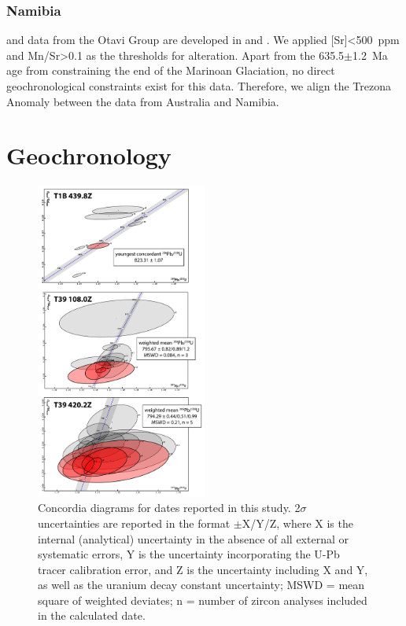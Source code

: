 \subsubsection{Namibia}

\dC and \SrSr data from the Otavi Group are developed in \citet{Halverson2005a} and \citet{Halverson2007b}. We applied [Sr]\textless500~ppm and Mn/Sr\textgreater0.1 as the thresholds for \SrSr alteration. Apart from the 635.5$\pm$1.2~Ma age from \citet{Hoffmann2004a} constraining the end of the Marinoan Glaciation, no direct geochronological constraints exist for this data. Therefore, we align the Trezona Anomaly between the data from Australia and Namibia.

\clearpage

\section{Geochronology}

\begin{figure}[h!]
\begin{center}
	\includegraphics[width=0.5\textwidth]{figures/Tambien/concordia.pdf}
	\caption{Concordia diagrams for dates reported in this study. 2$\sigma$ uncertainties are reported in the format $\pm$X/Y/Z, where X is the internal (analytical) uncertainty in the absence of all external or systematic errors, Y is the uncertainty incorporating the U-Pb tracer calibration error, and Z is the uncertainty including X and Y, as well as the uranium decay constant uncertainty; MSWD = mean square of weighted deviates; n = number of zircon analyses included in the calculated date.}
	\label{fig:concordia}
\end{center}
\end{figure}


